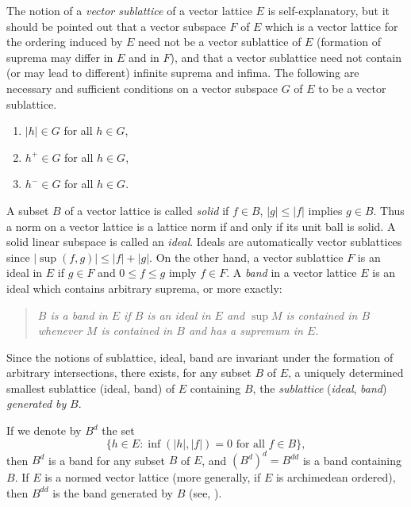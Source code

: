 The notion of a \emph{vector sublattice} of a vector lattice $ E $ is self-explanatory, but it should be pointed out that a vector subspace $ F $ of\/ $ E $ which is a vector lattice for the ordering induced by $ E $ need not be a vector sublattice of\/ $ E $ (formation of suprema may differ in $ E $ and in $ F $), and that a vector sublattice need not contain (or may lead to different) infinite suprema and infima.
The following are necessary and sufficient conditions on a vector subspace $ G $ of\/ $ E $ to be a vector sublattice.
\begin{enumerate}[\upshape (a)]
	\item 
	$ |h| \in G $ for all $ h \in G $, 

	\item 
	$ h^{+} \in G $ for all $ h \in G $, 
	
	\item 
	$ h^{-} \in G $ for all $ h \in G $.
\end{enumerate}
A subset $ B $ of a vector lattice is called \emph{solid} if\/ $ f \in B $, $ |g| \leq |f| $ implies $ g \in B $.
Thus a norm on a vector lattice is a lattice norm if and only if its unit ball is solid.
A solid linear subspace is called an \emph{ideal}.
Ideals are automatically vector sublattices since $ |\sup(f,g)| \leq |f| + |g| $.
On the other hand, a vector sublattice $ F $ is an ideal in $ E $ if\/ $ g \in F $ and $ 0 \leq f \leq g $ imply $ f \in F $.
A \emph{band} in a vector lattice $ E $ is an ideal which contains arbitrary suprema, or more exactly: 
\begin{quote}
\textit{$ B $ is a band in $ E $ if\/ $ B $ is an ideal in $ E $ and $ \sup M $ is contained in $ B $ whenever $ M $ is contained in $ B $ and has a supremum in $ E $.}
\end{quote}
Since the notions of sublattice, ideal, band are invariant under the formation of arbitrary intersections, there exists, for any subset $ B $ of\/ $ E $, a uniquely determined smallest sublattice (ideal, band) of\/ $ E $ containing $ B $, \ie the \emph{sublattice} (\emph{ideal}, \emph{band}) \emph{generated by} $ B $.

If we denote by $ B^{d} $ the set 
\[
\{h \in E \colon \inf(|h|,|f|) = 0 \text{ for all $f \in B$}\},
\]
then $ B^{d} $ is a band for any subset $ B $ of\/ $ E $, and $ (B^{d})^{d} = B^{dd} $ is a band containing $ B $.
If\/ $ E $ is a normed vector lattice (more generally, if\/ $ E $ is archimedean ordered), then $ B^{dd} $ is the band generated by $ B $ (see, \eg \textcite{schaefer:1974}).

